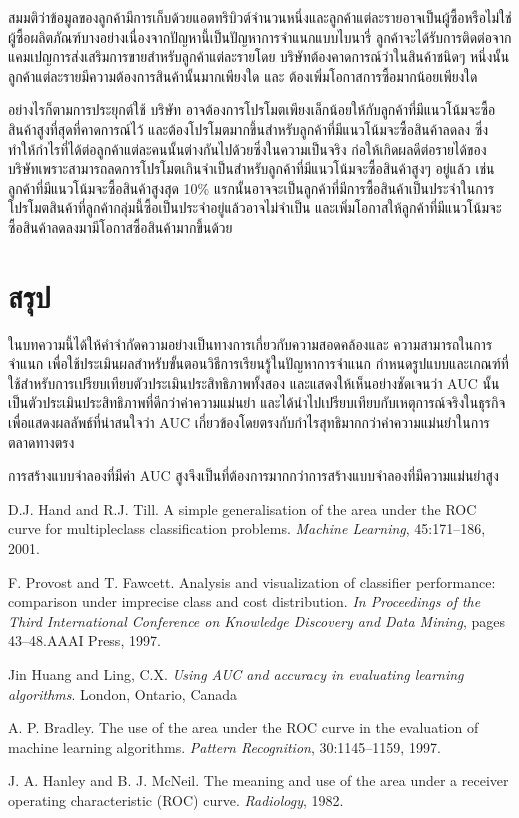 \documentclass[twoside, twocolumn, 12pt]{article}
\begin{document}
สมมติว่าข้อมูลของลูกค้ามีการเก็บด้วยแอตทริบิวต์จำนวนหนึ่งและลูกค้าแต่ละรายอาจเป็นผู้ซื้อหรือไม่ใช่ผู้ซื้อผลิตภัณฑ์บางอย่างเนื่องจากปัญหานี้เป็นปัญหาการจำแนกแบบไบนารี่ ลูกค้าจะได้รับการติดต่อจากแคมเปญการส่งเสริมการขายสำหรับลูกค้าแต่ละรายโดย บริษัทต้องคาดการณ์ว่าในสินค้าชนิดๆ หนึ่งนั้นลูกค้าแต่ละรายมีความต้องการสินค้านั้นมากเพียงใด และ ต้องเพิ่มโอกาสการซื้อมากน้อยเพียงใด

อย่างไรก็ตามการประยุกต์ใช้ บริษัท อาจต้องการโปรโมตเพียงเล็กน้อยให้กับลูกค้าที่มีแนวโน้มจะซื้อสินค้าสูงที่สุดที่คาดการณ์ไว้ และต้องโปรโมตมากขึ้นสำหรับลูกค้าที่มีแนวโน้มจะซื้อสินค้าลดลง ซึ่งทำให้กำไรที่ได้ต่อลูกค้าแต่ละคนนั้นต่างกันไปด้วยซึ่งในความเป็นจริง ก่อให้เกิดผลดีต่อรายได้ของบริษัทเพราะสามารถลดการโปรโมตเกินจำเป็นสำหรับลูกค้าที่มีแนวโน้มจะซื้อสินค้าสูงๆ อยู่แล้ว เช่น ลูกค้าที่มีแนวโน้มจะซื้อสินค้าสูงสุด 10\% แรกนั้นอาจจะเป็นลูกค้าที่มีการซื้อสินค้าเป็นประจำในการโปรโมตสินค้าที่ลูกค้ากลุ่มนี้ซื้อเป็นประจำอยู่แล้วอาจไม่จำเป็น และเพิ่มโอกาสให้ลูกค้าที่มีแนวโน้มจะซื้อสินค้าลดลงมามีโอกาสซื้อสินค้ามากขึ้นด้วย 
\section{สรุป}
\quad ในบทความนี้ได้ให้คำจำกัดความอย่างเป็นทางการเกี่ยวกับความสอดคล้องและ ความสามารถในการจำแนก เพื่อใช้ประเมินผลสำหรับขั้นตอนวิธีการเรียนรู้ในปัญหาการจำแนก กำหนดรูปแบบและเกณฑ์ที่ใช้สำหรับการเปรียบเทียบตัวประเมินประสิทธิภาพทั้งสอง และแสดงให้เห็นอย่างชัดเจนว่า AUC นั้นเป็นตัวประเมินประสิทธิภาพที่ดีกว่าค่าความแม่นยำ และได้นำไปเปรียบเทียบกับเหตุการณ์จริงในธุรกิจเพื่อแสดงผลลัพธ์ที่น่าสนใจว่า AUC เกี่ยวข้องโดยตรงกับกำไรสุทธิมากกว่าค่าความแม่นยำในการตลาดทางตรง

การสร้างแบบจำลองที่มีค่า AUC สูงจึงเป็นที่ต้องการมากกว่าการสร้างแบบจำลองที่มีความแม่นยำสูง
\renewcommand\refname{ข้อมูลอ้างอิง}

\begin{thebibliography}{9}

D.J. Hand and R.J. Till. A simple generalisation of the area under the ROC curve for multipleclass classification problems. \textit{Machine Learning}, 45:171–186, 2001.

F. Provost and T. Fawcett. Analysis and visualization of classifier performance: comparison under imprecise class and cost distribution. \textit{In Proceedings of the Third International Conference on Knowledge Discovery and Data Mining}, pages 43–48.AAAI Press, 1997.

{Jin Huang} and Ling, C.X. \textit{Using {AUC} and accuracy in evaluating learning algorithms}. London, Ontario, Canada

A. P. Bradley. The use of the area under the ROC curve in the evaluation of machine learning algorithms. \textit{Pattern Recognition}, 30:1145–1159, 1997.

J. A. Hanley and B. J. McNeil. The meaning and use of the area under a receiver operating characteristic (ROC) curve. \textit{Radiology}, 1982.

\end{thebibliography}
\end{document}
